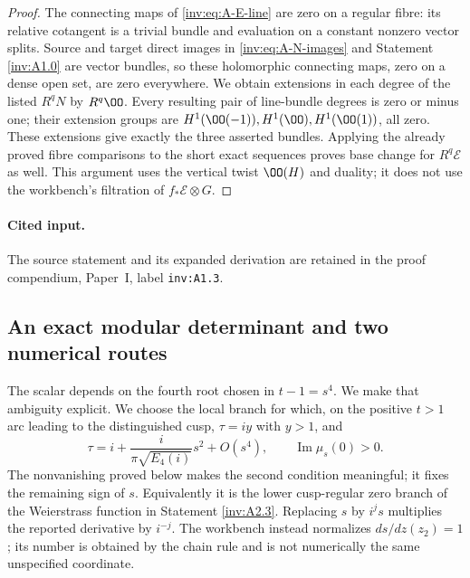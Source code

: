 \begin{proof}
The connecting maps of \eqref{inv:eq:A-E-line} are zero on a regular
fibre: its relative cotangent is a trivial bundle and evaluation on
a constant nonzero vector splits.  Source and target direct images
in \eqref{inv:eq:A-N-images} and Statement \ref{inv:A1.0} are vector bundles,
so these holomorphic connecting maps, zero on a dense open set, are
zero everywhere.  We obtain extensions in each degree of the listed
$R^qN$ by $R^q\OO$.  Every resulting pair of line-bundle degrees is
zero or minus one; their extension groups are
$H^1(\OO(-1)),H^1(\OO),H^1(\OO(1))$, all zero.  These extensions
give exactly the three asserted bundles.  Applying the already proved
fibre comparisons to the short exact sequences proves base change
for $R^q\mathcal E$ as well.  This argument uses the vertical twist
$\OO(H)$ and duality; it does not use the workbench's filtration of
$f_*\mathcal E\otimes G$.
\end{proof}


\paragraph{Cited input.} \label{inv:A1.3}\label{wb:prop:absolute-cotangent-direct-images}\label{inv:eq:A-absolute-table}The source statement and its expanded derivation are retained in the proof compendium, Paper~I, label \nolinkurl{inv:A1.3}.\par


\subsection{An exact modular determinant and two numerical routes}

The scalar depends on the fourth root chosen in $t-1=s^4$.  We make
that ambiguity explicit.  We choose the local branch for which, on
the positive $t>1$ arc leading to the distinguished cusp,
$\tau=iy$ with $y>1$, and
\begin{equation}\label{inv:eq:A-s-branch}
\tau=i+\frac{i}{\pi\sqrt{E_4(i)}}s^2+O(s^4),\qquad
\operatorname{Im}\mu_s(0)>0.
\end{equation}
The nonvanishing proved below makes the second condition meaningful;
it fixes the remaining sign of $s$.  Equivalently it is the lower
cusp-regular zero branch of the Weierstrass function in Statement \ref{inv:A2.3}.
Replacing $s$ by $i^js$ multiplies the reported derivative by $i^{-j}$.
The workbench instead normalizes $ds/dz(z_2)=1$; its number is obtained
by the chain rule and is not numerically the same unspecified coordinate.

